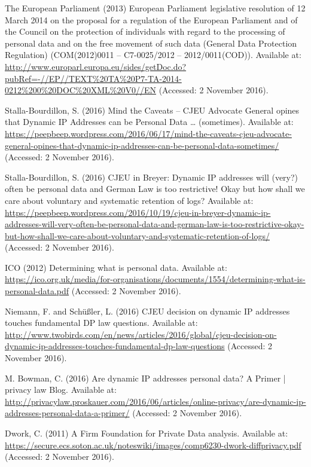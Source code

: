 \documentclass[9pt]{article}
\begin{document}
\begin{thebibliography}{99}
The European Parliament (2013) European Parliament legislative resolution of 12 March 2014 on the proposal for a regulation of the European Parliament and of the Council on the protection of individuals with regard to the processing of personal data and on the free movement of such data (General Data Protection Regulation) (COM(2012)0011 – C7-0025/2012 – 2012/0011(COD)). Available at: \url{http://www.europarl.europa.eu/sides/getDoc.do?pubRef=-//EP//TEXT%20TA%20P7-TA-2014-0212%200%20DOC%20XML%20V0//EN} (Accessed: 2 November 2016).

Stalla-Bourdillon, S. (2016) Mind the Caveats – CJEU Advocate General opines that Dynamic IP Addresses can be Personal Data … (sometimes). Available at: \url{https://peepbeep.wordpress.com/2016/06/17/mind-the-caveats-cjeu-advocate-general-opines-that-dynamic-ip-addresses-can-be-personal-data-sometimes/} (Accessed: 2 November 2016).

Stalla-Bourdillon, S. (2016) CJEU in Breyer: Dynamic IP addresses will (very?) often be personal data and German Law is too restrictive! Okay but how shall we care about voluntary and systematic retention of logs? Available at: \url{https://peepbeep.wordpress.com/2016/10/19/cjeu-in-breyer-dynamic-ip-addresses-will-very-often-be-personal-data-and-german-law-is-too-restrictive-okay-but-how-shall-we-care-about-voluntary-and-systematic-retention-of-logs/} (Accessed: 2 November 2016).

ICO (2012) Determining what is personal data. Available at: \url{https://ico.org.uk/media/for-organisations/documents/1554/determining-what-is-personal-data.pdf} (Accessed: 2 November 2016).

Niemann, F. and Schüßler, L. (2016) CJEU decision on dynamic IP addresses touches fundamental DP law questions. Available at: \url{http://www.twobirds.com/en/news/articles/2016/global/cjeu-decision-on-dynamic-ip-addresses-touches-fundamental-dp-law-questions} (Accessed: 2 November 2016).

M. Bowman, C. (2016) Are dynamic IP addresses personal data? A Primer | privacy law Blog. Available at: \url{http://privacylaw.proskauer.com/2016/06/articles/online-privacy/are-dynamic-ip-addresses-personal-data-a-primer/} (Accessed: 2 November 2016).

Dwork, C. (2011) A Firm Foundation for Private Data analysis. Available at: \url{https://secure.ecs.soton.ac.uk/noteswiki/images/comp6230-dwork-diffprivacy.pdf} (Accessed: 2 November 2016).


\end{thebibliography}
\end{document}
